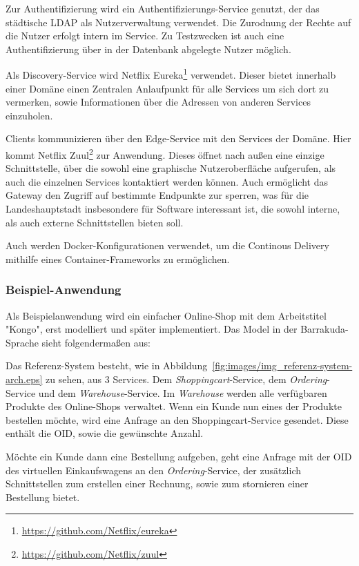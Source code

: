 \documentclass[12pt,a4paper,bibliography=totocnumbered,listof=totocnumbered]{scrartcl}
\begin{document}
Zur Authentifizierung wird ein Authentifizierungs-Service genutzt, der das städtische \acs{LDAP} als Nutzerverwaltung verwendet. Die Zurodnung der Rechte auf die Nutzer erfolgt intern im Service. Zu Testzwecken ist auch eine Authentifizierung über in der Datenbank abgelegte Nutzer möglich.

Als Discovery-Service wird Netflix Eureka\footnote{\url{https://github.com/Netflix/eureka}} verwendet. Dieser bietet innerhalb einer Domäne einen Zentralen Anlaufpunkt für alle Services um sich dort zu vermerken, sowie Informationen über die Adressen von anderen Services einzuholen.

Clients kommunizieren über den Edge-Service mit den Services der Domäne. Hier kommt Netflix Zuul\footnote{\url{https://github.com/Netflix/zuul}} zur Anwendung. Dieses öffnet nach außen eine einzige Schnittstelle, über die sowohl eine graphische Nutzeroberfläche aufgerufen, als auch die einzelnen Services kontaktiert werden können. Auch ermöglicht das Gateway den Zugriff auf bestimmte Endpunkte zur sperren, was für die Landeshauptstadt insbesondere für Software interessant ist, die sowohl interne, als auch externe Schnittstellen bieten soll.

Auch werden Docker-Konfigurationen verwendet, um die Continous Delivery mithilfe eines Container-Frameworks zu ermöglichen.

\subsubsection{Beispiel-Anwendung}

Als Beispielanwendung wird ein einfacher Online-Shop mit dem Arbeitstitel "Kongo", erst modelliert und später implementiert. Das Model in der Barrakuda-Sprache sieht folgendermaßen aus:



Das Referenz-System besteht, wie in Abbildung~\ref{fig:images/img_referenz-system-arch.eps} zu sehen, aus 3 Services. Dem \textit{Shoppingcart}-Service, dem \textit{Ordering}-Service und dem \textit{Warehouse}-Service. Im \textit{Warehouse} werden alle verfügbaren Produkte des Online-Shops verwaltet. Wenn ein Kunde nun eines der Produkte bestellen möchte, wird eine Anfrage an den Shoppingcart-Service gesendet. Diese enthält die OID, sowie die gewünschte Anzahl.

Möchte ein Kunde dann eine Bestellung aufgeben, geht eine Anfrage mit der OID des virtuellen Einkaufswagens an den \textit{Ordering}-Service, der zusätzlich Schnittstellen zum erstellen einer Rechnung, sowie zum stornieren einer Bestellung bietet.
\end{document}
